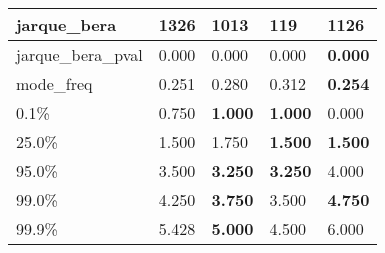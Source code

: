 \begin{table}[H]
\begin{tabular}{|l|m{10em}|m{10em}|m{10em}|m{10em}|}
\hline jarque\_bera & 1326 & 1013 & \cellcolor[rgb]{0.9, 0.54, 0.52} 119 & \bfseries 1126 \\
\hline jarque\_bera\_pval & 0.000 & 0.000 & \cellcolor[rgb]{0.9, 0.54, 0.52} 0.000 & \bfseries 0.000 \\
\hline mode\_freq & 0.251 & 0.280 & \cellcolor[rgb]{0.9, 0.54, 0.52} 0.312 & \bfseries 0.254 \\
\hline 0.1\% & 0.750 & \bfseries 1.000 & \bfseries 1.000 & \cellcolor[rgb]{0.9, 0.54, 0.52} 0.000 \\
\hline 25.0\% & 1.500 & \cellcolor[rgb]{0.9, 0.54, 0.52} 1.750 & \bfseries 1.500 & \bfseries 1.500 \\
\hline 95.0\% & 3.500 & \bfseries 3.250 & \bfseries 3.250 & \cellcolor[rgb]{0.9, 0.54, 0.52} 4.000 \\
\hline 99.0\% & 4.250 & \bfseries 3.750 & \cellcolor[rgb]{0.9, 0.54, 0.52} 3.500 & \bfseries 4.750 \\
\hline 99.9\% & 5.428 & \bfseries 5.000 & \cellcolor[rgb]{0.9, 0.54, 0.52} 4.500 & 6.000 \\
\hline
\end{tabular}
\end{table}

